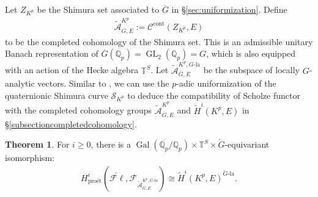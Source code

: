 \documentclass{article}
\theoremstyle{definition}
\newtheorem{theorem}{Theorem}[section]
\def\calA{\mathcal{A}}
\def\calC{\mathcal{C}}
\def\calF{\mathcal{F}}
\def\calS{\mathcal{S}}
\def\bbQ{\mathbb{Q}}
\def\bbT{\mathbb{T}}
\def\isom{\cong}
\DeclareMathOperator{\Gal}{Gal}
\DeclareMathOperator{\GL}{GL}
\DeclareMathOperator{\cont}{cont}
\def\et{\text{\'et}}
\def\lan{\mathrm{la}}
\def\bar{\overline}
\def\tilde{\widetilde}
\def\-{\text{-}}
\def\pro{\mathrm{pro}}
\def\-{\text{-}}
\def\fl{\mathscr{F}\ell}
\begin{document}
Let $Z_{K^p}$ be the Shimura set associated to $\bar G$ in \S\ref{sec:uniformization}. Define 
\begin{align*}
    \tilde{\calA}^{K^p}_{\bar G,E}:=\calC^{\cont}(Z_{K^p},E)
\end{align*}
to be the completed cohomology of the Shimura set. This is an admissible unitary Banach representation of $\bar G(\bbQ_p)=\GL_2(\bbQ_p)=G$, which is also equipped with an action of the Hecke algebra $\bbT^S$. Let $\tilde{\calA}^{K^p,G\-\lan}_{\bar G,E}$ be the subspace of locally $G$-analytic vectors.  Similar to \cite[Theorem 6.2]{Scholze2018LubinTate}, we can use the $p$-adic uniformization of the quaternionic Shimura curve $\calS_{K^p}$ to deduce the compatibility of Scholze functor with the completed cohomology groups $\tilde{\calA}^{K^p}_{\bar G,E}$ and $\tilde{H}^i(K^p,E)$ in \S\ref{subsectioncompletedcohomology}. 
\begin{theorem}\label{thm:ScholzeFunctor}
For $i\ge 0$, there is a $\Gal(\overline{\bbQ_p}/\bbQ_p)\times \bbT^S\times \check{G}$-equivariant isomorphism:
\begin{align*}
    H^i_{\pro\et}(\check{\fl},\calF_{\tilde{\calA}^{K^p,G\-\lan}_{\bar G,E}})\isom \tilde{H}^i(K^p,E)^{\check{G}\-\lan}.
\end{align*}
\end{theorem}
\end{document}
